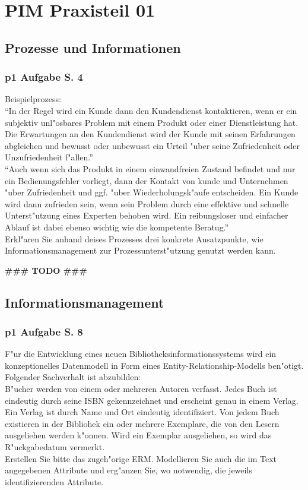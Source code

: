 
\chapter{PIM Praxisteil 01}

\section{Prozesse und Informationen}

\subsection{p1 Aufgabe S. 4}

Beispielprozess:\\
"`In der Regel wird ein Kunde dann den Kundendienst kontaktieren, wenn er ein subjektiv unl"osbares Problem mit einem Produkt oder einer Dienstleistung hat.
Die Erwartungen an den Kundendienst wird der Kunde mit seinen Erfahrungen abgleichen und bewusst oder unbewusst ein Urteil "uber seine Zufriedenheit oder Unzufriedenheit f"allen."'\\
"`Auch wenn sich das Produkt in einem einwandfreien Zustand befindet und nur ein Bedienungsfehler vorliegt, dann der Kontakt von kunde und Unternehmen "uber Zufriedenheit und ggf. "uber Wiederholungsk"aufe entscheiden.
Ein Kunde wird dann zufrieden sein, wenn sein Problem durch eine effektive und schnelle Unterst"utzung eines Experten behoben wird.
Ein reibungsloser und einfacher Ablauf ist dabei ebenso wichtig wie die kompetente Beratug."'\\

\noindent
Erkl"aren Sie anhand deises Prozesses drei konkrete Ansatzpunkte, wie Informationsmanagement zur Prozessunterst"utzung genutzt werden kann.


\textbf{\#\#\# TODO \#\#\#}\\



\section{Informationsmanagement}

\subsection{p1 Aufgabe S. 8}

F"ur die Entwicklung eines neuen Bibliotheksinformationssystems wird ein konzeptionelles Datenmodell in Form eines Entity-Relationship-Modells ben"otigt.
Folgender Sachverhalt ist abzubilden:\\
B"ucher werden von einem oder mehreren Autoren verfasst.
Jedes Buch ist eindeutig durch seine ISBN gekennzeichnet und erscheint genau in einem Verlag.
Ein Verlag ist durch Name und Ort eindeutig identifiziert.
Von jedem Buch existieren in der Bibliohek ein oder mehrere Exemplare, die von den Lesern ausgeliehen werden k"onnen.
Wird ein Exemplar ausgeliehen, so wird das R"uckgabedatum vermerkt.\\
Erstellen Sie bitte das zugeh"orige ERM.
Modellieren Sie auch die im Text angegebenen Attribute und erg"anzen Sie, wo notwendig, die jeweils identifizierenden Attribute.

